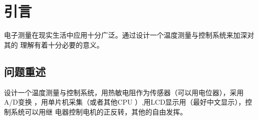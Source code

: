 \documentclass[../main]{subfiles}
\begin{document}
\chapter{引言}%
\label{cha:introduction}

电子测量在现实生活中应用十分广泛。通过设计一个温度测量与控制系统来加深对其的
理解有着十分必要的意义。

\section{问题重述}%
\label{sec:problem}

\begin{Exercise}
  设计一个温度测量与控制系统，用热敏电阻作为传感器（可以用电位器），采用A/D变换
  ，用单片机采集（或者其他CPU ）,用LCD显示用（最好中文显示），控制系统可以用继
  电器控制电机的正反转，其他的自由发挥。\cite{高礼忠2015电子测量技术基础}
\end{Exercise}
\end{document}
